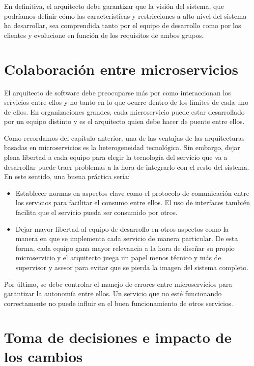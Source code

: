 \documentclass[11pt,a4paper]{article}
\begin{document}
En definitiva, el arquitecto debe garantizar que la visión del sistema, que podríamos definir cómo las características y restricciones a alto nivel del sistema ha desarrollar, sea comprendida tanto por el equipo de desarrollo como por los clientes y evolucione en función de los requisitos de ambos grupos.

\section{Colaboración entre microservicios}

El arquitecto de software debe preocuparse más por como interaccionan los servicios entre ellos y no tanto en lo que ocurre dentro de los límites de cada uno de ellos. En organizaciones grandes, cada microservicio puede estar desarrollado por un equipo distinto y es el arquitecto quien debe hacer de puente entre ellos.

Como recordamos del capítulo anterior, una de las ventajas de las arquitecturas basadas en microservicios es la heterogeneidad tecnológica.  Sin embargo, dejar plena libertad a cada equipo para elegir la tecnología del servicio que va a desarrollar puede traer problemas a la hora de integrarlo con el resto del sistema. En este sentido, una buena práctica sería:

\begin{itemize}

\item Establecer normas en aspectos clave como el protocolo de comunicación entre los servicios para facilitar el consumo entre ellos. El uso de interfaces también facilita que el servicio pueda ser consumido por otros.

\item Dejar mayor libertad al equipo de desarrollo en otros aspectos como la manera en que se implementa cada servicio de manera particular. De esta forma, cada equipo gana mayor relevancia a la hora de diseñar su propio microservicio y el arquitecto juega un papel menos técnico y más de supervisor y asesor para evitar que se pierda la imagen del sistema completo.

\end{itemize}

Por último, se debe controlar el manejo de errores entre microservicios para garantizar la autonomía entre ellos. Un servicio que no esté funcionando correctamente no puede influir en el buen funcionamiento de otros servicios.

\section{Toma de decisiones e impacto de los cambios}
\end{document}
